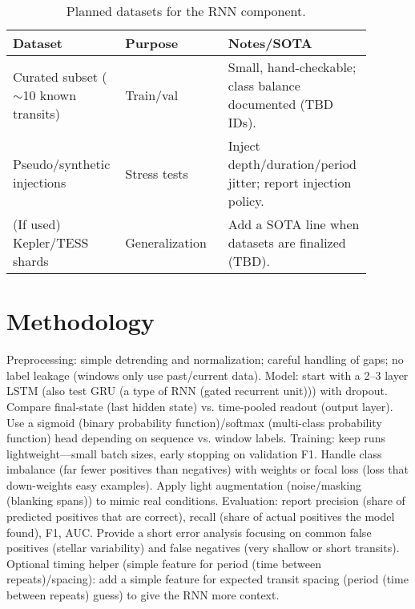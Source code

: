 \documentclass[letterpaper]{article}
\begin{document}
\begin{table}[t]
\centering
\begin{tabular}{p{0.28\linewidth} p{0.28\linewidth} p{0.33\linewidth}}
\hline
\textbf{Dataset} & \textbf{Purpose} & \textbf{Notes/SOTA} \\ \hline
Curated subset ($\sim$10 known transits) & Train/val & Small, hand-checkable; class balance documented (TBD IDs). \\
Pseudo/synthetic injections & Stress tests & Inject depth/duration/period jitter; report injection policy. \\
(If used) Kepler/TESS shards & Generalization & Add a SOTA line when datasets are finalized (TBD). \\ \hline
\end{tabular}
\caption{{Planned datasets for the RNN component.}}
\label{{tab:datasets}}
\end{table}


\section{Methodology}
Preprocessing: simple detrending and normalization; careful handling of gaps; no label leakage (windows only use past/current data).
Model: start with a 2–3 layer LSTM (also test GRU (a type of RNN (gated recurrent unit))) with dropout. Compare final-state (last hidden state) vs. time‑pooled readout (output layer). Use a sigmoid (binary probability function)/softmax (multi-class probability function) head depending on sequence vs. window labels.
Training: keep runs lightweight—small batch sizes, early stopping on validation F1. Handle class imbalance (far fewer positives than negatives) with weights or focal loss (loss that down-weights easy examples). Apply light augmentation (noise/masking (blanking spans)) to mimic real conditions.
Evaluation: report precision (share of predicted positives that are correct), recall (share of actual positives the model found), F1, AUC. Provide a short error analysis focusing on common false positives (stellar variability) and false negatives (very shallow or short transits).
Optional timing helper (simple feature for period (time between repeats)/spacing): add a simple feature for expected transit spacing (period (time between repeats) guess) to give the RNN more context.
\end{document}
